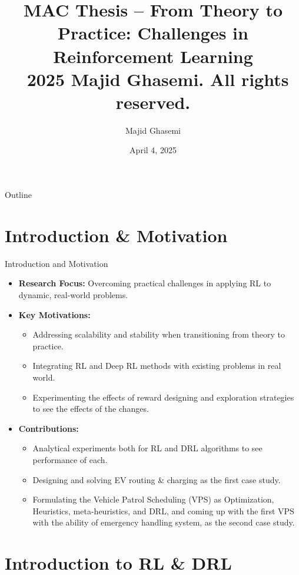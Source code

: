 \documentclass{beamer}
\title[Challenges in RL]{MAC Thesis -- From Theory to Practice: Challenges in Reinforcement Learning\\[1ex]
\small \textcopyright\ 2025 Majid Ghasemi. All rights reserved.}
\author{Majid Ghasemi}
\institute[Wilfrid Laurier University]{Department of Physics and Computer Science\\ Master of Applied Computing\\Wilfrid Laurier University}
\date{April 4, 2025}
\begin{document}
\begin{frame}
  \titlepage
\end{frame}

\begin{frame}{Outline}
  \tableofcontents %
\end{frame}

\section{Introduction \& Motivation}
\begin{frame}{Introduction and Motivation}
  \begin{itemize}[<+->]
    \item \textbf{Research Focus:} Overcoming practical challenges in applying RL to dynamic, real-world problems.
    \item \textbf{Key Motivations:}
      \begin{itemize}[<+->]
        \item Addressing scalability and stability when transitioning from theory to practice.
        \item Integrating RL and Deep RL methods with existing problems in real world.
        \item Experimenting the effects of reward designing and exploration strategies to see the effects of the changes.
      \end{itemize}
    \item \textbf{Contributions:}
      \begin{itemize}[<+->]
        \item Analytical experiments both for RL and DRL algorithms to see performance of each.
        \item Designing and solving EV routing \& charging as the first case study.
        \item Formulating the Vehicle Patrol Scheduling (VPS) as Optimization, Heuristics, meta-heuristics, and DRL, and coming up with the first VPS with the ability of emergency handling system, as the second case study.
      \end{itemize}
  \end{itemize}
\end{frame}


\section{Introduction to RL \& DRL}
\end{document}
